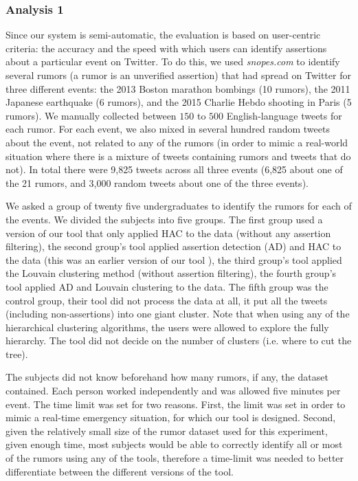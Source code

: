 \documentclass[letterpaper]{article}
\begin{document}
\subsubsection{Analysis 1}
Since our system is semi-automatic, the evaluation is based on user-centric criteria: the accuracy and the speed with which users can identify assertions about a particular event on Twitter. To do this, we used \emph{snopes.com} to identify several rumors (a rumor is an unverified assertion) that had spread on Twitter for three different events: the 2013 Boston marathon bombings (10 rumors), the 2011 Japanese earthquake (6 rumors), and the 2015 Charlie Hebdo shooting in Paris (5 rumors). We manually collected between $150$ to $500$ English-language tweets for each rumor. For each event, we also mixed in several hundred random tweets about the event, not related to any of the rumors (in order to mimic a real-world situation where there is a mixture of tweets containing rumors and tweets that do not). In total there were 9,825 tweets across all three events (6,825 about one of the 21 rumors, and 3,000 random tweets about one of the three events).

We asked a group of twenty five undergraduates to identify the rumors for each of the events. We divided the subjects into five groups. The first group used a version of our tool that only applied HAC to the data (without any assertion filtering), the second group's tool applied assertion detection (AD) and HAC to the data (this was an earlier version of our tool \cite{vosoughi_rd_2015}), the third group's tool applied the Louvain clustering method (without assertion filtering), the fourth group's tool applied AD and Louvain clustering to the data. The fifth group was the control group, their tool did not process the data at all, it put all the tweets (including non-assertions) into one giant cluster. Note that when using any of the hierarchical clustering algorithms, the users were allowed to explore the fully hierarchy. The tool did not decide on the number of clusters (i.e. where to cut the tree).

The subjects did not know beforehand how many rumors, if any, the dataset contained. Each person worked independently and was allowed five minutes per event. The time limit was set for two reasons. First, the limit was set in order to mimic a real-time emergency situation, for which our tool is designed. Second, given the relatively small size of the rumor dataset used for this experiment, given enough time, most subjects would be able to correctly identify all or most of the rumors using any of the tools, therefore a time-limit was needed to better differentiate between the different versions of the tool.
\end{document}
